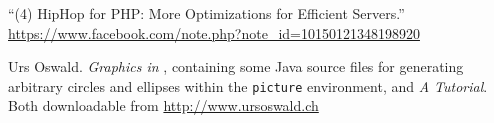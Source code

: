 \begin{thebibliography}{99}
	“(4) HipHop for PHP: More Optimizations for Efficient Servers.”  \url{https://www.facebook.com/note.php?note_id=10150121348198920}
	
 Urs Oswald.  
    \newblock \emph{Graphics in \LaTeXe{}}, containing some Java source files for 
    generating arbitrary circles and ellipses within the \texttt{picture} environment,
    and \emph{ A Tutorial}.
  \newblock Both downloadable from \url{http://www.ursoswald.ch}
\end{thebibliography}

